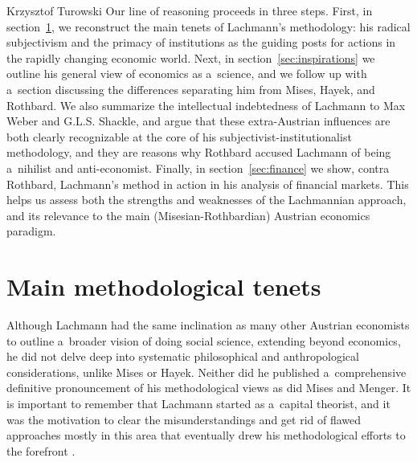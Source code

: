 \begin{artengenv}{Krzysztof Turowski}
Our line of reasoning proceeds in three steps.
First, in section~\ref{sec:tenets}, we reconstruct the main tenets of Lachmann's methodology: his radical subjectivism and the primacy of institutions as the guiding posts for actions in the rapidly changing economic world.
Next, in section~\ref{sec:inspirations} we outline his general view of economics as a~science, and we follow up with a~section discussing the differences separating him from Mises, Hayek, and Rothbard. We also summarize the intellectual indebtedness of Lachmann to Max Weber and G.L.S. Shackle, and argue that these extra-Austrian influences are both clearly recognizable at the core of his subjectivist-institutionalist methodology, and they are reasons why Rothbard accused Lachmann of being a~nihilist and anti-economist.
Finally, in section~\ref{sec:finance} we show, contra Rothbard, Lachmann's method in action in his analysis of financial markets. This helps us assess both the strengths and weaknesses of the Lachmannian approach, and its relevance to the main (Misesian-Rothbardian) Austrian economics paradigm.

\section{Main methodological tenets}
\label{sec:tenets}

Although Lachmann had the same inclination as many other Austrian economists to outline a~broader vision of doing social science, extending beyond economics, he did not delve deep into systematic philosophical and anthropological considerations, unlike Mises or Hayek. Neither did he published a~comprehensive definitive pronouncement of his methodological views as did Mises and Menger.
It is important to remember that Lachmann started as a~capital theorist, and it was the motivation to clear the misunderstandings and get rid of flawed approaches mostly in this area that eventually drew his methodological efforts to the forefront \parencite[215]{prychitko-review}.


\end{artengenv}
